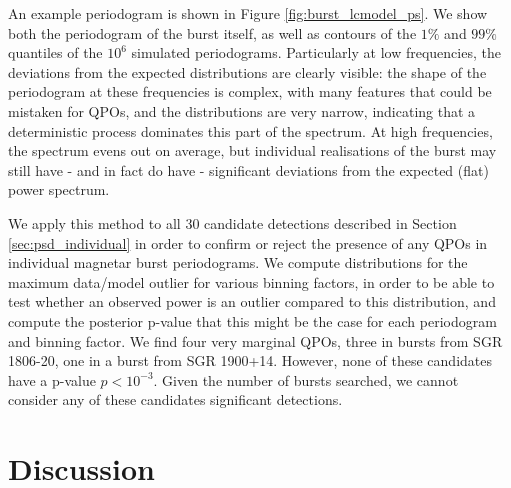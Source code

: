 \documentclass[numberedappendix]{emulateapj}
\begin{document}
An example periodogram is shown in Figure \ref{fig:burst_lcmodel_ps}. We show both the periodogram of the burst itself, as well as contours of the $1\%$ and $99\%$ quantiles of the $10^6$ simulated periodograms. Particularly at low frequencies, the deviations from the expected distributions are clearly visible: the shape of the periodogram at these frequencies is complex, with many features that could be mistaken for QPOs, and the distributions are very narrow, indicating that a deterministic process dominates this part of the spectrum. At high frequencies, the spectrum evens out on average, but individual realisations of the burst may still have - and in fact do have - significant deviations from the expected (flat) power spectrum.

We apply this method to all $30$ candidate detections described in Section \ref{sec:psd_individual} in order to confirm or reject the presence of any QPOs in individual magnetar burst periodograms. We compute distributions for the maximum data/model outlier for various binning factors, in order to be able to test whether an observed power is an outlier compared to this distribution, and compute the posterior p-value that this might be the case for each periodogram and binning factor. 
We find four very marginal QPOs, three in bursts from SGR 1806-20, one in a burst from SGR 1900+14. However, none of these candidates have a p-value $p < 10^{-3}$. Given the number of bursts searched, we cannot consider any of these candidates significant detections.


\section{Discussion}
\label{sec:discussion}
\end{document}
